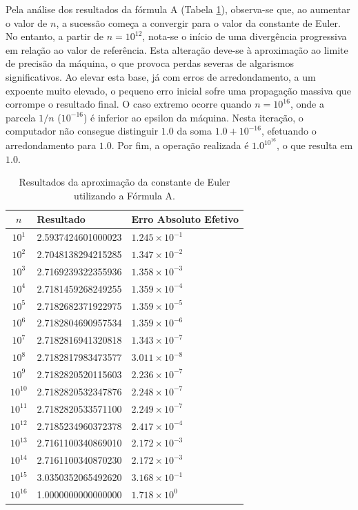 \documentclass{article}
\begin{document}
Pela análise dos resultados da fórmula A (Tabela \ref{tab:formula_a}), observa-se que, ao aumentar o valor de $n$, a sucessão começa a convergir para o valor da constante de Euler. No entanto, a partir de $n=10^{12}$, nota-se o início de uma divergência progressiva em relação ao valor de referência. Esta alteração deve-se à aproximação ao limite de precisão da máquina, o que provoca perdas severas de algarismos significativos. Ao elevar esta base, já com erros de arredondamento, a um expoente muito elevado, o pequeno erro inicial sofre uma propagação massiva que corrompe o resultado final. O caso extremo ocorre quando $n=10^{16}$, onde a parcela $1/n$ ($10^{-16}$) é inferior ao epsilon da máquina. Nesta iteração, o computador não consegue distinguir $1.0$ da soma $1.0 + 10^{-16}$, efetuando o arredondamento para $1.0$. Por fim, a operação realizada é $1.0^{10^{16}}$, o que resulta em $1.0$.

\begin{table}[H]
    \centering
    \begin{tabular}{|c|l|l|}
        \hline
        \textbf{$n$} & \textbf{Resultado} & \textbf{Erro Absoluto Efetivo} \\ \hline
        $10^{1}$  & 2.5937424601000023 & $1.245 \times 10^{-1}$ \\ \hline
        $10^{2}$  & 2.7048138294215285 & $1.347 \times 10^{-2}$ \\ \hline
        $10^{3}$  & 2.7169239322355936 & $1.358 \times 10^{-3}$ \\ \hline
        $10^{4}$  & 2.7181459268249255 & $1.359 \times 10^{-4}$ \\ \hline
        $10^{5}$  & 2.7182682371922975 & $1.359 \times 10^{-5}$ \\ \hline
        $10^{6}$  & 2.7182804690957534 & $1.359 \times 10^{-6}$ \\ \hline
        $10^{7}$  & 2.7182816941320818 & $1.343 \times 10^{-7}$ \\ \hline
        $10^{8}$  & 2.7182817983473577 & $3.011 \times 10^{-8}$ \\ \hline
        $10^{9}$  & 2.7182820520115603 & $2.236 \times 10^{-7}$ \\ \hline
        $10^{10}$ & 2.7182820532347876 & $2.248 \times 10^{-7}$ \\ \hline
        $10^{11}$ & 2.7182820533571100 & $2.249 \times 10^{-7}$ \\ \hline
        $10^{12}$ & 2.7185234960372378 & $2.417 \times 10^{-4}$ \\ \hline
        $10^{13}$ & 2.7161100340869010 & $2.172 \times 10^{-3}$ \\ \hline
        $10^{14}$ & 2.7161100340870230 & $2.172 \times 10^{-3}$ \\ \hline
        $10^{15}$ & 3.0350352065492620 & $3.168 \times 10^{-1}$ \\ \hline
        $10^{16}$ & 1.0000000000000000 & $1.718 \times 10^{0}$  \\ \hline
    \end{tabular}
    \vspace{0.2cm}
    \caption{Resultados da aproximação da constante de Euler utilizando a Fórmula A.}
    \label{tab:formula_a}
\end{table}
\end{document}
